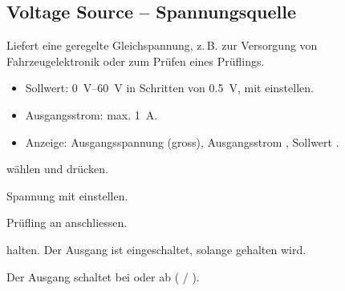\subsection{Voltage Source -- Spannungsquelle}
\label{sec:mode_vsrc}
Liefert eine geregelte Gleichspannung, z.\,B. zur Versorgung von Fahrzeugelektronik oder zum
Prüfen eines Prüflings.
\begin{itemize}
    \item Sollwert: \qtyrange{0}{60}{\volt} in Schritten von \qty{0.5}{\volt}, mit \enc{} einstellen.
    \item Ausgangsstrom: max. \qty{1}{\ampere}.
    \item Anzeige: Ausgangsspannung (gross), Ausgangsstrom , Sollwert .
\end{itemize}
\begin{steps}
    \item {} wählen und  drücken.
    \item Spannung mit \enc{} einstellen.
    \item Prüfling an  anschliessen.
    \item {} halten. Der Ausgang ist eingeschaltet, solange  gehalten wird.
\end{steps}
\begin{caution}
    Der Ausgang schaltet bei  oder  ab ( / ).
\end{caution}

